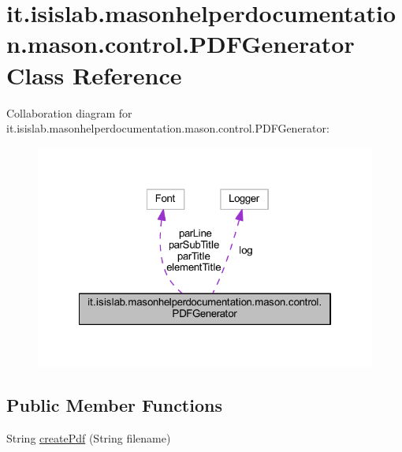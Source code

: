 \hypertarget{classit_1_1isislab_1_1masonhelperdocumentation_1_1mason_1_1control_1_1_p_d_f_generator}{\section{it.\-isislab.\-masonhelperdocumentation.\-mason.\-control.\-P\-D\-F\-Generator Class Reference}
\label{classit_1_1isislab_1_1masonhelperdocumentation_1_1mason_1_1control_1_1_p_d_f_generator}
}


Collaboration diagram for it.\-isislab.\-masonhelperdocumentation.\-mason.\-control.\-P\-D\-F\-Generator\-:\nopagebreak
\begin{figure}[H]
\begin{center}
\leavevmode
\includegraphics[width=322pt]{classit_1_1isislab_1_1masonhelperdocumentation_1_1mason_1_1control_1_1_p_d_f_generator__coll__graph}
\end{center}
\end{figure}
\subsection*{Public Member Functions}
\begin{DoxyCompactItemize}
\item 
String \hyperlink{classit_1_1isislab_1_1masonhelperdocumentation_1_1mason_1_1control_1_1_p_d_f_generator_af54a565ca57780023cc3ac7a386a6dbb}{create\-Pdf} (String filename)
\end{DoxyCompactItemize}
